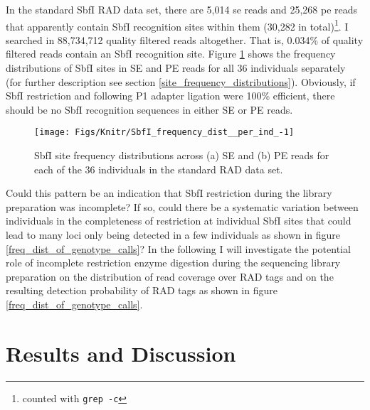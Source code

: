 \documentclass[a4paper,12pt,times,authoryear,twoside,print,index]{Classes/PhDThesisPSnPDF}\usepackage[]{graphicx}\usepackage[]{color}
\newenvironment{knitrout}{}{} %
\begin{document}
In the standard SbfI RAD data set, there are 5,014 \gls{se} reads and 25,268 \gls{pe} reads that apparently contain \gls{SbfI} recognition sites within them (30,282 in total)\footnote{counted with \texttt{grep -c}}. I searched in 88,734,712 quality filtered reads altogether. That is, 0.034\% of quality filtered reads contain an SbfI recognition site. Figure \ref{SbfI_frequency_dist_per_ind} shows the frequency distributions of SbfI sites in SE and PE reads for all 36 individuals separately (for further description see section \ref{site_frequency_distributions}). Obviously, if SbfI restriction and following P1 adapter ligation were 100\% efficient, there should be no SbfI recognition sequences in either SE or PE reads. 
%
\begin{figure}[htb]
\centering
\begin{knitrout}
\color{fgcolor}

{\centering \texttt{[image: Figs/Knitr/SbfI\_frequency\_dist\_\_per\_ind\_-1]} 

}



\end{knitrout}
\caption{SbfI site frequency distributions across (a) SE and (b) PE reads for each of the 36 individuals in the standard RAD data set.}
\label{SbfI_frequency_dist_per_ind}
\end{figure}
%
Could this pattern be an indication that SbfI restriction during the library preparation was incomplete? If so, could there be a systematic variation between individuals in the completeness of restriction at individual SbfI sites that could lead to many loci only being detected in a few individuals as shown in figure \ref{freq_dist_of_genotype_calls}?
In the following I will investigate the potential role of incomplete restriction enzyme digestion  during the sequencing library preparation on the distribution of read coverage over \glspl{RAD tag} and on the resulting detection probability of RAD tags as shown in figure \ref{freq_dist_of_genotype_calls}.  


\FloatBarrier
\section{Results and Discussion}
\end{document}
